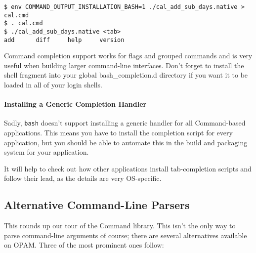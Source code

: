 \begin{lstlisting}
$ env COMMAND_OUTPUT_INSTALLATION_BASH=1 ./cal_add_sub_days.native > cal.cmd
$ . cal.cmd
$ ./cal_add_sub_days.native <tab>
add      diff     help     version
\end{lstlisting}

Command completion support works for flags and grouped commands and is
very useful when building larger command-line interfaces. Don't forget
to install the shell fragment into your global bash\_completion.d
directory if you want it to be loaded in all of your login shells.

\hypertarget{installing-a-generic-completion-handler}{%
\paragraph{Installing a Generic Completion
Handler}\label{installing-a-generic-completion-handler}}

Sadly, \passthrough{\lstinline!bash!} doesn't support installing a
generic handler for all Command-based applications. This means you have
to install the completion script for every application, but you should
be able to automate this in the build and packaging system for your
application.

It will help to check out how other applications install tab-completion
scripts and follow their lead, as the details are very OS-specific.

\hypertarget{alternative-command-line-parsers}{%
\subsection{Alternative Command-Line
Parsers}\label{alternative-command-line-parsers}}

This rounds up our tour of the Command library. This isn't the only way
to parse command-line arguments of course; there are several
alternatives available on OPAM. Three of the most prominent ones follow:

